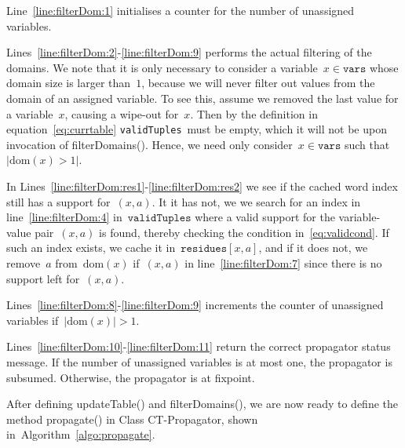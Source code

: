 \documentclass[a4paper,11pt]{article}
\newcommand{\Algoref}[1]{Algorithm~\ref{#1}}
\newcommand{\Lineref}[1]{Line~\ref{#1}}
\newcommand{\Linesref}[2]{Lines~\ref{#1}-\ref{#2}}
\newcommand{\Dom}[1]{\text{dom}({#1})}
\newcommand{\Scp}{\texttt{vars}}
\newcommand{\CurrTable}{\texttt{validTuples}}
\newcommand{\Residues}{\texttt{residues}}
\numberwithin{equation}{section}
\begin{document}
\begin{enumerate}
  \begin{algorithm}[H]
    \begin{algorithmic}[1]  %
      
    \end{algorithmic}
    \caption{Method filterDomains() in Class CT-Propagator. The
    infrastructure is such that this method is called after updateTable()
  in \Algoref{algo:updateTable} has been called for each variable
whose domain is modified, and only if at least one variable x}
    \label{algo:filterDomains}
  \end{algorithm}

  \Lineref{line:filterDom:1} initialises a counter for the number of unassigned
  variables.

  \Linesref{line:filterDom:2}{line:filterDom:9} performs the
  actual filtering of the domains. We note that it is only necessary to
  consider a variable~$x \in \Scp$ whose domain size is larger than~$1$,
  because we will never filter out values from the domain of an assigned
  variable. To see this, assume we removed the last value for a variable~$x$,
  causing a wipe-out for~$x$. Then by the definition in equation~\eqref{eq:currtable}
  \CurrTable~must be empty,
  which it will not be upon invocation of filterDomains(). Hence, we need
  only consider~$x \in \Scp$ such that~$|\Dom{x} > 1|$.

  In \Linesref{line:filterDom:res1}{line:filterDom:res2} we see if the
  cached word index still has a support for~$(x,a)$. It it has not, we
  we search for an index in line~\ref{line:filterDom:4} in~$\CurrTable$
  where a valid support for the variable-value pair~$(x,a)$ is found, 
  thereby checking the condition in~\eqref{eq:validcond}.
  If such an index exists, we cache it in~$\Residues[x,a]$, and
  if it does not, we remove~$a$ from~$\Dom{x}$ if~$(x,a)$ in 
  line~\ref{line:filterDom:7} since there is no support left for~$(x,a)$.

  \Linesref{line:filterDom:8}{line:filterDom:9}
  increments the counter of unassigned variables if~$|\Dom{x}| > 1$.

  \Linesref{line:filterDom:10}{line:filterDom:11} return the correct
  propagator status message. If the number of unassigned variables is
  at most one, the propagator is subsumed. Otherwise, the propagator
  is at fixpoint.
  
\end{enumerate}

After defining updateTable() and filterDomains(), we are now ready to
define the method propagate() in Class CT-Propagator, shown 
in~\Algoref{algo:propagate}.
\end{document}
